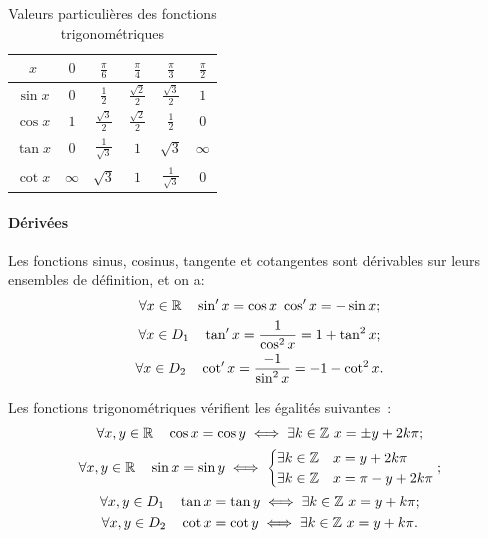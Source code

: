 %
\renewcommand{\arraystretch}{2.2}
\begin{table}
  \centering  
  \begin{tabular}{|c|c|c|c|c|c|}
    \hline
    $\displaystyle x$& $\displaystyle 0$&$\displaystyle \frac{\pi}{6}$&$\displaystyle \frac{\pi}{4}$&$\displaystyle \frac{\pi}{3}$&$\displaystyle \frac{\pi}{2}$\\ \hline
    $\displaystyle \sin x$ &$\displaystyle  0$ &$\displaystyle  \frac{1}{2}$ &$\displaystyle  \frac{\sqrt{2}}{2}$ & $\displaystyle \frac{\sqrt{3}}{2}$ &$\displaystyle  1 $\\ \hline
    $\displaystyle \cos x$ &$\displaystyle  1 $&$\displaystyle \frac{\sqrt{3}}{2}$ & $\displaystyle \frac{\sqrt{2}}{2}$ & $\displaystyle \frac{1}{2}$ & $\displaystyle 0$ \\ \hline
    $\displaystyle \tan x$ & $\displaystyle  0 $&$\displaystyle \frac{1}{\sqrt{3}}$ & $\displaystyle 1$ & $\displaystyle \sqrt{3}$ & $\displaystyle \infty$ \\ \hline
    $\displaystyle \cot x$ & $\displaystyle \infty$ & $\displaystyle \sqrt{3}$ &$\displaystyle  1$ & $\displaystyle \frac{1}{\sqrt{3}}$ &$\displaystyle  0$\\ \hline
  \end{tabular}
  \caption{Valeurs particulières des fonctions trigonométriques}
  \label{tab:valeurpart}
\end{table}
\renewcommand{\arraystretch}{1}
\paragraph{Dérivées}
Les fonctions sinus, cosinus, tangente et cotangentes sont dérivables sur leurs ensembles de définition, et on a:
\begin{gather} 
\forall x \in \mathbb{R} \quad \sin'x=\cos x \ \cos'x=-\sin x; \\
\forall x \in D_1 \quad \tan'x=\frac{1}{\cos^2 x}=1+\tan^2 x; \\
\forall x \in D_2 \quad \cot'x=\frac{-1}{\sin^2 x}=-1-\cot^2 x.
\end{gather}
\begin{prop} 
  Les fonctions trigonométriques vérifient les égalités suivantes~:
  \begin{gather} 
    \forall x, y \in \R \quad \cos x = \cos y \iff \exists k \in \Z \ x=\pm y + 2k\pi;\\
    \forall x, y \in \R \quad \sin x = \sin y \iff \begin{cases} \exists k \in \Z & x = y + 2 k \pi \\ \exists k \in \Z & x = \pi - y + 2 k \pi\end{cases}; \\
    \forall x, y \in D_1 \quad \tan x = \tan y \iff \exists k \in \Z \ x = y + k \pi;\\
    \forall x, y \in D_2 \quad \cot x = \cot y \iff \exists k \in \Z \ x = y + k \pi.
  \end{gather}
\end{prop}

